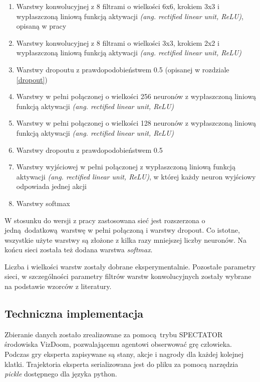 \documentclass[polish,master,a4paper,oneside]{ppfcmthesis}
\begin{document}
\begin{enumerate}
\item{Warstwy konwolucyjnej z 8 filtrami o wielkości 6x6, krokiem 3x3 i wypłaszczoną liniową funkcją aktywacji \textit{(ang. rectified linear unit, ReLU)}, opisaną w pracy \cite{AISTATS2011_GlorotBB11}}
\item{Warstwy konwolucyjnej z 8 filtrami o wielkości 3x3, krokiem 2x2 i wypłaszczoną liniową funkcją aktywacji \textit{(ang. rectified linear unit, ReLU)}}
\item{Warstwy dropoutu z prawdopodobieństwem 0.5 (opisanej w rozdziale \ref{dropout})} 
\item{Warstwy w pełni połączonej o wielkości 256 neuronów z wypłaszczoną liniową funkcją aktywacji \textit{(ang. rectified linear unit, ReLU)}}
\item{Warstwy w pełni połączonej o wielkości 128 neuronów z wypłaszczoną liniową funkcją aktywacji \textit{(ang. rectified linear unit, ReLU)}}
\item{Warstwy dropoutu z prawdopodobieństwem 0.5}
\item{Warstwy wyjściowej w pełni połączonej z wypłaszczoną liniową funkcją aktywacji \textit{(ang. rectified linear unit, ReLU)}, w której każdy neuron wyjściowy odpowiada jednej akcji}
\item{Warstwy softmax}
\end{enumerate}

W stosunku do wersji z pracy \cite{DBLP:journals/corr/KempkaWRTJ16} zastosowana sieć jest rozszerzona o jedną dodatkową warstwę w pełni połączoną i warstwy dropout. Co istotne, wszystkie użyte warstwy są złożone z kilka razy mniejszej liczby neuronów. Na końcu sieci została też dodana warstwa \textit{softmax}.

Liczba i wielkości warstw zostały dobrane eksperymentalnie. Pozostałe parametry sieci, w szczególności parametry filtrów warstw konwolucyjnych zostały wybrane na podstawie wzorców z literatury.

\subsection{Techniczna implementacja} \label{behavioral_cloning_tech}

Zbieranie danych zostało zrealizowane za pomocą trybu SPECTATOR środowiska VizDoom, pozwalającemu agentowi obserwować grę człowieka. Podczas gry eksperta zapisywane są stany, akcje i nagrody dla każdej kolejnej klatki. Trajektoria eksperta serializowana jest do pliku za pomocą narzędzia \textit{pickle} dostępnego dla języka python.
\end{document}
